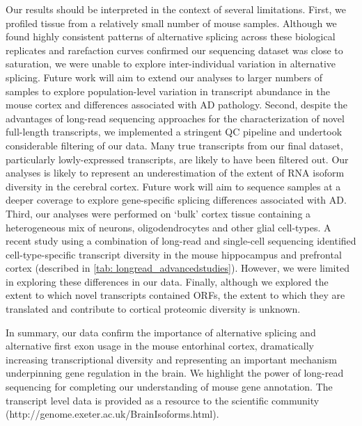 Our results should be interpreted in the context of several limitations. First, we profiled tissue from a relatively small number of mouse samples. Although we found highly consistent patterns of alternative splicing across these biological replicates and rarefaction curves confirmed our sequencing dataset was close to saturation, we were unable to explore inter-individual variation in alternative splicing. Future work will aim to extend our analyses to larger numbers of samples to explore population-level variation in transcript abundance in the mouse cortex and differences associated with AD pathology. Second, despite the advantages of long-read sequencing approaches for the characterization of novel full-length transcripts, we implemented a stringent QC pipeline and undertook considerable filtering of our data. Many true transcripts from our final dataset, particularly lowly-expressed transcripts, are likely to have been filtered out. Our analyses is likely to represent an underestimation of the extent of RNA isoform diversity in the cerebral cortex. Future work will aim to sequence samples at a deeper coverage to explore gene-specific splicing differences associated with AD. Third, our analyses were performed on ‘bulk’ cortex tissue containing a heterogeneous mix of neurons, oligodendrocytes and other glial cell-types. A recent study using a combination of long-read and single-cell sequencing identified cell-type-specific transcript diversity in the mouse hippocampus and prefrontal cortex\cite{Joglekar2021} (described in \cref{tab: longread_advancedstudies}). However, we were limited in exploring these differences in our data. Finally, although we explored the extent to which novel transcripts contained ORFs, the extent to which they are translated and contribute to cortical proteomic diversity is unknown.  

In summary, our data confirm the importance of alternative splicing and alternative first exon usage in the mouse entorhinal cortex, dramatically increasing transcriptional diversity and representing an important mechanism underpinning gene regulation in the brain. We highlight the power of long-read sequencing for completing our understanding of mouse gene annotation. The transcript level data is provided as a resource to the scientific community (http://genome.exeter.ac.uk/BrainIsoforms.html). 







